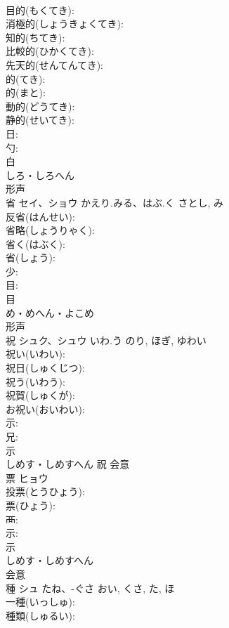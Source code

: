 \documentclass[8pt]{extreport}
\begin{document}
\begin{CJK}{UTF8}{min}
\\	目的(もくてき): 
\\	消極的(しょうきょくてき): 
\\	知的(ちてき): 
\\	比較的(ひかくてき): 
\\	先天的(せんてんてき): 
\\	的(てき): 
\\	的(まと): 
\\	動的(どうてき): 
\\	静的(せいてき): 
\\	日: 
\\	勺: 
\\	白	
\\	しろ・しろへん	
\\	形声 
\\	省	セイ、ショウ	かえり.みる、はぶ.く	さとし, み	
\\	反省(はんせい): 
\\	省略(しょうりゃく): 
\\	省く(はぶく): 
\\	省(しょう): 
\\	少: 
\\	目: 
\\	目	
\\	め・めへん・よこめ	
\\	形声 
\\	祝	シュク、シュウ	いわ.う	のり, ほぎ, ゆわい	
\\	祝い(いわい): 
\\	祝日(しゅくじつ): 
\\	祝う(いわう): 
\\	祝賀(しゅくが): 
\\	お祝い(おいわい): 
\\	示: 
\\	兄: 
\\	示	
\\	しめす・しめすへん	祝	会意 
\\	票	ヒョウ			
\\	投票(とうひょう): 
\\	票(ひょう): 
\\	襾: 
\\	示: 
\\	示	
\\	しめす・しめすへん	
\\	会意 
\\	種	シュ	たね、-ぐさ	おい, くさ, た, ほ	
\\	一種(いっしゅ): 
\\	種類(しゅるい): 

\end{CJK}
\end{document}
